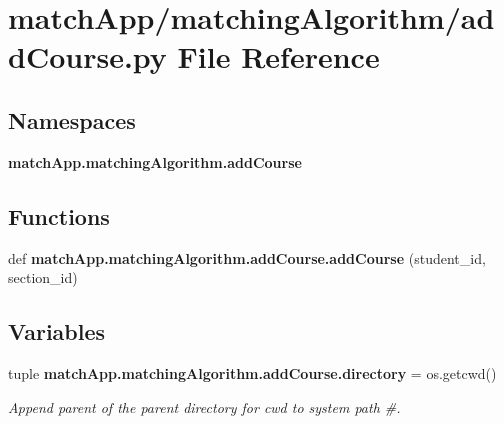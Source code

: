 \section{match\+App/matching\+Algorithm/add\+Course.py File Reference}
\label{add_course_8py}
\subsection*{Namespaces}
\begin{DoxyCompactItemize}
\item 
 {\bf match\+App.\+matching\+Algorithm.\+add\+Course}
\end{DoxyCompactItemize}
\subsection*{Functions}
\begin{DoxyCompactItemize}
\item 
def {\bf match\+App.\+matching\+Algorithm.\+add\+Course.\+add\+Course} (student\+\_\+id, section\+\_\+id)
\end{DoxyCompactItemize}
\subsection*{Variables}
\begin{DoxyCompactItemize}
\item 
tuple {\bf match\+App.\+matching\+Algorithm.\+add\+Course.\+directory} = os.\+getcwd()
\begin{DoxyCompactList}\small\item\em Append parent of the parent directory for cwd to system path \#. \end{DoxyCompactList}\end{DoxyCompactItemize}
